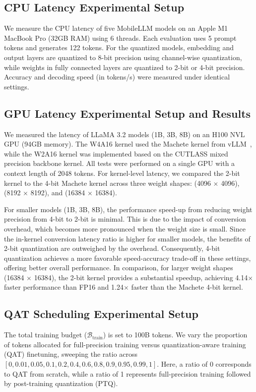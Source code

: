 \subsection{CPU Latency Experimental Setup}
We measure the CPU latency of five MobileLLM models on an Apple M1 MacBook Pro (32GB RAM) using 6 threads.  Each evaluation uses 5 prompt tokens and generates 122 tokens.  For the quantized models, embedding and output layers are quantized to 8-bit precision using channel-wise quantization, while weights in fully connected layers are quantized to 2-bit or 4-bit precision. Accuracy and decoding speed (in tokens/s) were measured under identical settings.

\subsection{GPU Latency Experimental Setup and Results}

We measured the latency of LLaMA 3.2 models (1B, 3B, 8B) on an H100 NVL GPU (94GB memory). The W4A16 kernel used the Machete kernel from vLLM~\cite{kwon2023efficient, machete}, while the W2A16 kernel was implemented based on the CUTLASS mixed precision backbone kernel. All tests were performed on a single GPU with a context length of 2048 tokens. For kernel-level latency, we compared the 2-bit kernel to the 4-bit Machete kernel across three weight shapes: (4096 $\times$ 4096), (8192 $\times$ 8192), and (16384 $\times$ 16384).

For smaller models (1B, 3B, 8B), the performance speed-up from reducing weight precision from 4-bit to 2-bit is minimal. This is due to the impact of conversion overhead, which becomes more pronounced when the weight size is small. Since the in-kernel conversion latency ratio is higher for smaller models, the benefits of 2-bit quantization are outweighed by the overhead. Consequently, 4-bit quantization achieves a more favorable speed-accuracy trade-off in these settings, offering better overall performance.
In comparison, for larger weight shapes (16384 $\times$ 16384), the 2-bit kernel provides a substantial speedup, achieving 4.14$\times$ faster performance than FP16 and 1.24$\times$ faster than the Machete 4-bit kernel.


\subsection{QAT Scheduling Experimental Setup}
The total training budget (\(\mathcal{B}_{\text{train}}\)) is set to 100B tokens. We vary the proportion of tokens allocated for full-precision training versus quantization-aware training (QAT) finetuning, sweeping the ratio across \([0, 0.01, 0.05, 0.1, 0.2, 0.4, 0.6, 0.8, 0.9, 0.95, 0.99, 1]\). Here, a ratio of 0 corresponds to QAT from scratch, while a ratio of 1 represents full-precision training followed by post-training quantization (PTQ). 

